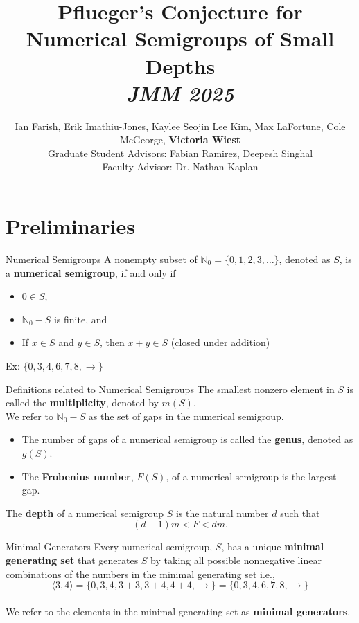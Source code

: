 \documentclass{beamer}
\title{Pflueger's Conjecture for Numerical Semigroups of Small Depths\\[5pt]\footnotesize{\textit{JMM 2025}}}
\author{Ian Farish, Erik Imathiu-Jones, Kaylee Seojin Lee Kim, Max LaFortune, Cole McGeorge, \textbf{Victoria Wiest}
\\[15pt] Graduate Student Advisors: Fabian Ramirez, Deepesh Singhal
\\[15pt] Faculty Advisor: Dr. Nathan Kaplan}
\institute{}
\date{}
\newcommand{\N}{{\mathbb N}}
\begin{document}
\begin{frame}
\titlepage
\end{frame}

\section{Preliminaries}
\begin{frame}{Numerical Semigroups}
    A nonempty subset of $\N_{0}=\{0,1,2,3,\dots\}$, denoted as $S$, is a \textbf{numerical semigroup}, if and only if

    \begin{itemize}
        \item $0\in S$,
        \item $\N_{0} - S$ is finite, and
        \item If $x\in S$ and $y\in S$, then $x+y\in S$ (closed under addition)
    \end{itemize}\vspace{8pt}
    Ex: $\{0,3,4,6,7,8,\to\}$
    
\end{frame}

\begin{frame}{Definitions related to Numerical Semigroups}
    The smallest nonzero element in $S$ is called the \textbf{multiplicity}, denoted by $m(S)$.\\[15pt]
    
    We refer to $\N_{0} - S$ as the set of gaps in the numerical semigroup. 
    \begin{itemize}
        \item The number of gaps of a numerical semigroup is called the \textbf{genus}, denoted as $g(S).$
        \item The \textbf{Frobenius number}, $F(S)$, of a numerical semigroup is the largest gap.
    \end{itemize}
    \vspace{15pt}
    The \textbf{depth} of a numerical semigroup $S$ is the natural number $d$ such that 
    \[(d-1)m<F<dm.\]
\end{frame}

\begin{frame}{Minimal Generators}
    Every numerical semigroup, $S$, has a unique \textbf{minimal generating set} that generates $S$ by taking all possible nonnegative linear combinations of the numbers in the minimal generating set i.e., 
    \[\langle3,4\rangle=\{0,3,4,3+3,3+4,4+4,\to\}=\{0,3,4,6,7,8,\to\}\]\\[15pt]
    
    We refer to the elements in the minimal generating set as \textbf{minimal generators}.
\end{frame}
\end{document}
